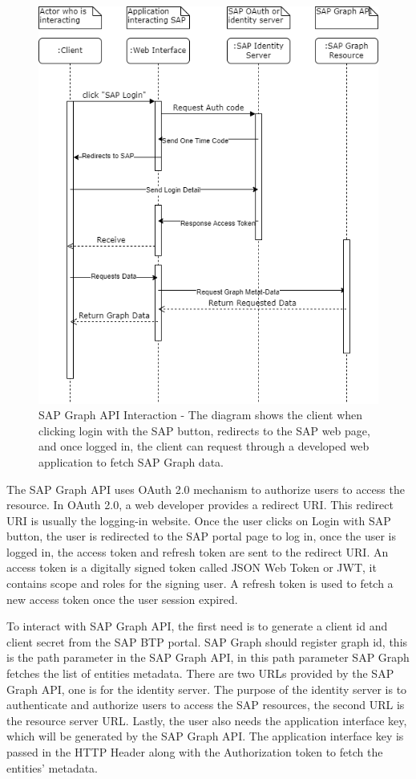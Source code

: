 \documentclass{article}
\begin{document}
\begin{figure}[ht!]
    \centering
    \includegraphics[scale=0.5]{sap-graph-api-interaction}
    \caption{SAP Graph API Interaction - The diagram shows the client when clicking login with the SAP button, redirects to the SAP web page, and once logged in, the client can request through a developed web application to fetch SAP Graph data.}
    \label{fig:graph-api}
\end{figure}

The SAP Graph API uses OAuth 2.0 mechanism to authorize users to access the resource. In OAuth 2.0, a web developer provides a redirect URI. This redirect URI is usually the logging-in website. Once the user clicks on Login with SAP button, the user is redirected to the SAP portal page to log in, once the user is logged in, the access token and refresh token are sent to the redirect URI. An access token is a digitally signed token called JSON Web Token or JWT, it contains scope and roles for the signing user. A refresh token is used to fetch a new access token once the user session expired.

To interact with SAP Graph API, the first need is to generate a client id and client secret from the SAP BTP portal. SAP Graph should register graph id, this is the path parameter in the SAP Graph API, in this path parameter SAP Graph fetches the list of entities metadata. There are two URLs provided by the SAP Graph API, one is for the identity server. The purpose of the identity server is to authenticate and authorize users to access the SAP resources, the second URL is the resource server URL. Lastly, the user also needs the application interface key, which will be generated by the SAP Graph API. The application interface key is passed in the HTTP Header along with the Authorization token to fetch the entities' metadata. 
\end{document}
